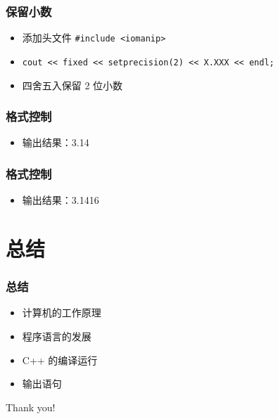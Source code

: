 \begin{frame}[fragile]
    \frametitle{保留小数}

    \begin{itemize}[<+->]
        \item 添加头文件 \lstinline|#include <iomanip>|
        \item \lstinline|cout << fixed << setprecision(2) << X.XXX << endl;|
        \item 四舍五入保留 2 位小数
    \end{itemize}
\end{frame}

\begin{frame}[fragile]
    \frametitle{格式控制}

    

    \begin{itemize}
        \item<2-> 输出结果：3.14
    \end{itemize}
\end{frame}

\begin{frame}[fragile]
    \frametitle{格式控制}

    

    \begin{itemize}
        \item<2-> 输出结果：3.1416
    \end{itemize}
\end{frame}


\section{总结}

\begin{frame}[fragile]
    \frametitle{总结}

    \begin{itemize}
        \item 计算机的工作原理
        \item 程序语言的发展
        \item C++ 的编译运行
        \item 输出语句
    \end{itemize}
\end{frame}

\begin{frame}
    \begin{center}
        {\Huge Thank you!}
    \end{center}
\end{frame}


